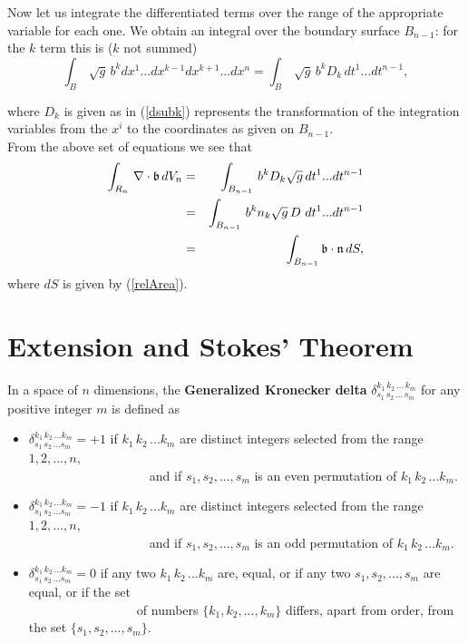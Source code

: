 Now let us integrate the differentiated terms over the range of the appropriate variable for each one. We obtain an integral over the boundary surface $B_{n-1}$: for the $k$ term this is ($k$ not summed)
\begin{equation}
\int_B \, \sqrt{g}\, b^k dx^1...dx^{k-1}dx^{k+1}...dx^n = \int_B \, \sqrt{g} \, b^k D_k\, dt^1...dt^{n-1},
\end{equation}

where $D_k$ is given as in (\ref{dsubk}) represents the transformation of the integration variables from the $x^i$ to the coordinates as given on $B_{n-1}$.\\

From the above set of equations we see that 
\begin{eqnarray*}
\int_{R_n}\, \nabla \cdot \mathfrak{b} \, dV_n &=& \int_{B_{n-1}} \, b^k D_k \sqrt{g}\, dt^1...dt^{n-1}\\
&=& \int_{B_{n-1}}\, b^k n_k \sqrt{g}\, D\ dt^1...dt^{n-1}\\
&=& \int_{B_{n-1}} \mathfrak{b} \cdot \mathfrak{n} \, dS,
\end{eqnarray*}
where $dS$ is given by (\ref{relArea}).

\section{Extension and Stokes' Theorem}

In a space of $n$ dimensions, the {\bf Generalized Kronecker delta} $\delta^{k_1\,k_2\,...\,k_m}_{s_1\,s_2\,...\,s_m}$ for any positive integer $m$ is defined as 
\begin{itemize}
\item[]$\delta^{k_1\,k_2\,...k_m}_{s_1\,s_2\,...s_m} = +1$ if $k_1\,k_2\,...k_m$ are distinct integers selected from the range $1, 2, ..., n$, \\
\null~~~~~~~~~~~~~~~~~~~and if $s_1, s_2, ...,s_m$ is an {\elevenit even} permutation of  $k_1\,k_2\,...k_m$.
\item[]$\delta^{k_1\,k_2\,...k_m}_{s_1\,s_2\,...s_m} = -1$ if $k_1\,k_2\,...k_m$ are distinct integers selected from the range $1, 2, ..., n$, \\
\null~~~~~~~~~~~~~~~~~~~and if $s_1, s_2, ...,s_m$ is an {\elevenit odd} permutation of  $k_1\,k_2\,...k_m$.
\item[]$\delta^{k_1\,k_2\,...k_m}_{s_1\,s_2\,...s_m} = 0$ if any two $k_1\,k_2\,...k_m$ are, equal, or if any two $s_1, s_2, ...,s_m$ are equal, or if the set \\
\null~~~~~~~~~~~~~~~~~of numbers $\{k_1, k_2, ..., k_m\}$ differs, apart from order, from the set $\{s_1, s_2, ..., s_m\}$.
\end{itemize} 

